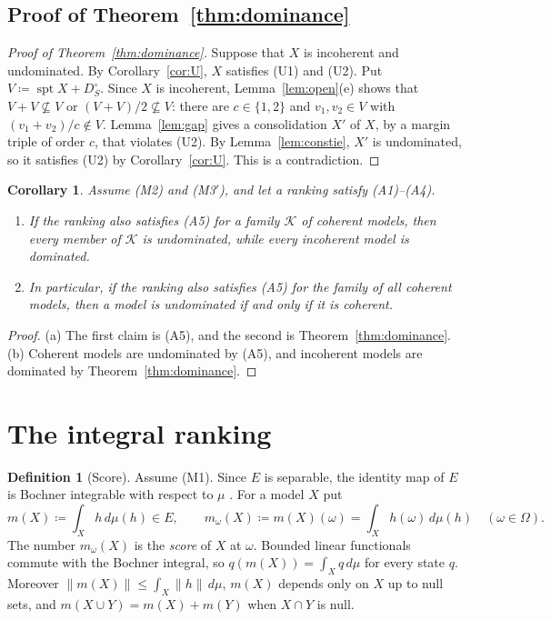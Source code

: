 \documentclass[11pt]{article}
\DeclareMathOperator{\spt}{spt}
\theoremstyle{plain}
\newtheorem{corollary}[theorem]{Corollary}
\theoremstyle{definition}
\newtheorem{definition}[theorem]{Definition}
\begin{document}
\subsection{Proof of Theorem~\ref{thm:dominance}}\label{sec:proof}

\begin{proof}[Proof of Theorem~\ref{thm:dominance}]
Suppose that $X$ is incoherent and undominated. By Corollary~\ref{cor:U}, $X$ satisfies (U1)
and (U2). Put $V\coloneqq\spt X+D_S^\circ$. Since $X$ is incoherent, Lemma~\ref{lem:open}(e) shows that
$V+V\not\subseteq V$ or $(V+V)/2\not\subseteq V$: there are $c\in\{1,2\}$ and $v_1,v_2\in V$
with $(v_1+v_2)/c\notin V$. Lemma~\ref{lem:gap} gives a consolidation $X'$ of $X$, by a margin
triple of order $c$, that violates (U2). By Lemma~\ref{lem:constie}, $X'$ is undominated, so it
satisfies (U2) by Corollary~\ref{cor:U}. This is a contradiction.
\end{proof}

\begin{corollary}\label{cor:admissible}
Assume (M2) and (M3$'$), and let a ranking satisfy (A1)--(A4).
\begin{enumerate}[label=(\alph*)]
  \item If the ranking also satisfies (A5) for a family $\mathcal K$ of coherent models, then
  every member of $\mathcal K$ is undominated, while every incoherent model is dominated.
  \item In particular, if the ranking also satisfies (A5) for the family of all coherent
  models, then a model is undominated if and only if it is coherent.
\end{enumerate}
\end{corollary}

\begin{proof}
(a) The first claim is (A5), and the second is Theorem~\ref{thm:dominance}. (b) Coherent
models are undominated by (A5), and incoherent models are dominated by
Theorem~\ref{thm:dominance}.
\end{proof}

\section{The integral ranking}\label{sec:integral}

\begin{definition}[Score]\label{def:score}
Assume (M1). Since $E$ is separable, the identity map of $E$ is Bochner integrable with respect
to $\mu$ \cite{DiestelUhl}. For a model $X$ put
\[
  m(X)\coloneqq\int_Xh\,d\mu(h)\in E,\qquad m_\omega(X)\coloneqq m(X)(\omega)=
  \int_Xh(\omega)\,d\mu(h)\quad(\omega\in\Omega).
\]
The number $m_\omega(X)$ is the \emph{score} of $X$ at $\omega$. Bounded linear functionals
commute with the Bochner integral, so $q(m(X))=\int_Xq\,d\mu$ for every state $q$. Moreover
$\|m(X)\|\le\int_X\|h\|\,d\mu$, $m(X)$ depends only on $X$ up to null sets, and
$m(X\cup Y)=m(X)+m(Y)$ when $X\cap Y$ is null.
\end{definition}
\end{document}
